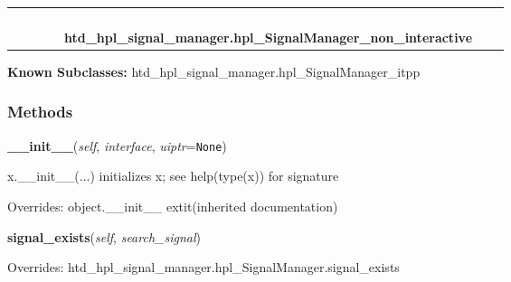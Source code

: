     \label{htd_hpl_signal_manager:hpl_SignalManager_non_interactive}
\begin{tabular}{cccccccc}
\multicolumn{2}{r}{\settowidth{\BCL}{object}\multirow{2}{\BCL}{object}}
&&
&&
  \\\cline{3-3}
  &&\multicolumn{1}{c|}{}
&&
&&
  \\
\multicolumn{4}{r}{\settowidth{\BCL}{htd\_hpl\_signal\_manager.hpl\_SignalManager}\multirow{2}{\BCL}{htd\_hpl\_signal\_manager.hpl\_SignalManager}}
&&
  \\\cline{5-5}
  &&&&\multicolumn{1}{c|}{}
&&
  \\
&&&&\multicolumn{2}{l}{\textbf{htd\_hpl\_signal\_manager.hpl\_SignalManager\_non\_interactive}}
\end{tabular}

\textbf{Known Subclasses:} htd\_hpl\_signal\_manager.hpl\_SignalManager\_itpp



  \subsubsection{Methods}

    \vspace{0.5ex}

\hspace{.8\funcindent}\begin{boxedminipage}{\funcwidth}

    \raggedright \textbf{\_\_init\_\_}(\textit{self}, \textit{interface}, \textit{uiptr}={\tt None})

\setlength{\parskip}{2ex}
    x.\_\_init\_\_(...) initializes x; see help(type(x)) for signature

\setlength{\parskip}{1ex}
      Overrides: object.\_\_init\_\_ 	extit{(inherited documentation)}

    \end{boxedminipage}

    \vspace{0.5ex}

\hspace{.8\funcindent}\begin{boxedminipage}{\funcwidth}

    \raggedright \textbf{signal\_exists}(\textit{self}, \textit{search\_signal})

\setlength{\parskip}{2ex}
\setlength{\parskip}{1ex}
      Overrides: htd\_hpl\_signal\_manager.hpl\_SignalManager.signal\_exists

    \end{boxedminipage}

